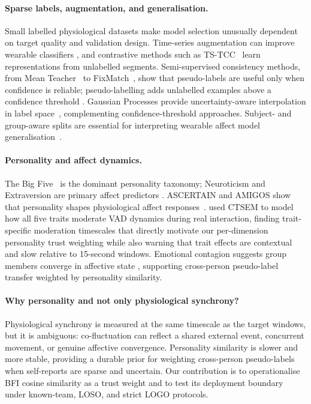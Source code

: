 \documentclass[sigconf,review,anonymous]{acmart}
\begin{document}
\begin{sloppypar}
\paragraph{Sparse labels, augmentation, and generalisation.}
Small labelled physiological datasets make model selection unusually
dependent on target quality and validation design.
Time-series augmentation can improve wearable classifiers
\cite{um2017data,iwana2021augmentation}, and contrastive methods such as
TS-TCC~\cite{eldele2021tscc} learn representations from unlabelled
segments.
Semi-supervised consistency methods, from Mean
Teacher~\cite{tarvainen2017mean} to FixMatch~\cite{sohn2020fixmatch},
show that pseudo-labels are useful only when confidence is reliable;
pseudo-labelling adds unlabelled examples above a confidence threshold
\cite{lee2013pseudo}.
Gaussian Processes provide uncertainty-aware interpolation in label
space~\cite{rasmussen2006gaussian,atcheson2017gp}, complementing
confidence-threshold approaches.
Subject- and group-aware splits are essential for interpreting wearable
affect model generalisation~\cite{ahmad2022survey,ventura2022validation}.

\paragraph{Personality and affect dynamics.}
The Big Five~\cite{john1999bigfive} is the dominant personality taxonomy;
Neuroticism and Extraversion are primary affect predictors
\cite{watson1992traits}.
ASCERTAIN and AMIGOS show that personality shapes physiological affect
responses~\cite{subramanian2018ascertain,mirandacorrea2021amigos}.
\citet{meng2026moderating} used CTSEM to model how all five traits moderate
VAD dynamics during real interaction, finding trait-specific moderation
timescales that directly motivate our per-dimension personality trust
weighting while also warning that trait effects are contextual and slow
relative to 15-second windows.
Emotional contagion suggests group members converge in affective state
\cite{hatfield1993emotional}, supporting cross-person pseudo-label transfer
weighted by personality similarity.

\paragraph{Why personality and not only physiological synchrony?}
Physiological synchrony is measured at the same timescale as the target
windows, but it is ambiguous: co-fluctuation can reflect a shared external
event, concurrent movement, or genuine affective convergence.
Personality similarity is slower and more stable, providing a durable prior
for weighting cross-person pseudo-labels when self-reports are sparse and
uncertain.
Our contribution is to operationalise BFI cosine similarity as a trust
weight and to test its deployment boundary under known-team, LOSO, and
strict LOGO protocols.
\end{sloppypar}
\end{document}
